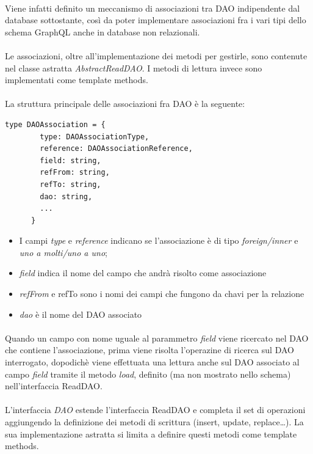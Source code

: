\documentclass[a4paper, 12pt]{report}
\begin{document}
    \paragraph*{}
    Viene infatti definito un meccanismo di associazioni tra DAO indipendente dal database sottostante, così da poter implementare associazioni fra i vari tipi dello schema GraphQL anche in database non relazionali.
    \paragraph*{}
    Le associazioni, oltre all'implementazione dei metodi per gestirle, sono contenute nel classe astratta \emph{AbstractReadDAO}.
    I metodi di lettura invece sono implementati come template methods.
    \paragraph*{}
    La struttura principale delle associazioni fra DAO è la seguente:
    \begin{Verbatim}[samepage=true]
      type DAOAssociation = {
        type: DAOAssociationType,
        reference: DAOAssociationReference,
        field: string,
        refFrom: string,
        refTo: string,
        dao: string,
        ...
      }
    \end{Verbatim}
    \begin{itemize}
      \item I campi \emph{type} e \emph{reference} indicano se l'associazione è di tipo \emph{foreign/inner} e \emph{uno a molti/uno a uno};
      \item \emph{field} indica il nome del campo che andrà risolto come associazione
      \item \emph{refFrom} e refTo sono i nomi dei campi che fungono da chavi per la relazione
      \item \emph{dao} è il nome del DAO associato
    \end{itemize}
    \paragraph*{}
    Quando un campo con nome uguale al parammetro \emph{field} viene ricercato nel DAO che contiene l'associazione, prima viene risolta l'operazine di ricerca sul DAO interrogato, dopodichè
    viene effettuata una lettura anche sul DAO associato al campo \emph{field} tramite il metodo \emph{load}, definito (ma non mostrato nello schema) nell'interfaccia ReadDAO.
    \paragraph*{}
    L'interfaccia \emph{DAO} estende l'interfaccia ReadDAO e completa il set di operazioni aggiungendo la definizione dei metodi di scrittura (insert, update, replace\dots).
    La sua implementazione astratta si limita a definire questi metodi come template methods.
\end{document}
